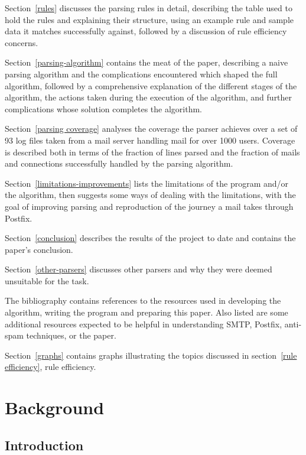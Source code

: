 \documentclass[a4paper,12pt,draft]{article}
\begin{document}
Section~\ref{rules} discusses the parsing rules in detail, describing the
table used to hold the rules and explaining their structure, using an
example rule and sample data it matches successfully against, followed by a
discussion of rule efficiency concerns.

Section~\ref{parsing-algorithm} contains the meat of the paper, describing
a naive parsing algorithm and the complications encountered which shaped
the full algorithm, followed by a comprehensive explanation of the
different stages of the algorithm, the actions taken during the execution
of the algorithm, and further complications whose solution completes the
algorithm.

Section~\ref{parsing coverage} analyses the coverage the parser achieves
over a set of 93 log files taken from a mail server handling mail for over
1000 users.  Coverage is described both in terms of the fraction of lines
parsed and the fraction of mails and connections successfully handled by
the parsing algorithm.

Section~\ref{limitations-improvements} lists the limitations of the program
and/or the algorithm, then suggests some ways of dealing with the
limitations, with the goal of improving parsing and reproduction of the
journey a mail takes through Postfix.

Section~\ref{conclusion} describes the results of the project to date and
contains the paper's conclusion.

Section~\ref{other-parsers} discusses other parsers and why they were
deemed unsuitable for the task.

The bibliography contains references to the resources used in developing
the algorithm, writing the program and preparing this paper.  Also listed
are some additional resources expected to be helpful in understanding SMTP,
Postfix, anti-spam techniques, or the paper.

Section~\ref{graphs} contains graphs illustrating the topics discussed in
section~\ref{rule efficiency}, rule efficiency.

\section{Background}

\label{background}

\subsection{Introduction}
\end{document}
